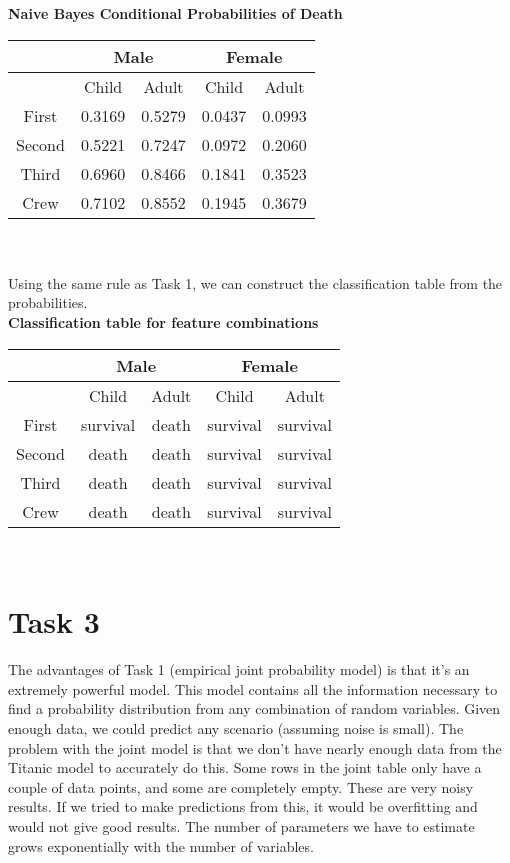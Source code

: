 \documentclass[letterpaper, 10pt]{article}
\begin{document}
\textbf{Naive Bayes Conditional Probabilities of Death} \\
\begin{tabular}{| c | c | c | c | c | }
    \hline
    & \multicolumn{2}{|c|}{Male} & \multicolumn{2}{|c|}{Female} \\ \hline
            & Child     & Adult     & Child     & Adult     \\ \hline
    First   & 0.3169  & 0.5279     & 0.0437  & 0.0993  \\ \hline
    Second  & 0.5221  & 0.7247     & 0.0972  & 0.2060  \\ \hline
    Third   & 0.6960     & 0.8466     & 0.1841     & 0.3523     \\ \hline
    Crew    & 0.7102  & 0.8552     & 0.1945  & 0.3679  \\ 
    \hline
\end{tabular}
\\\\

Using the same rule as Task 1, we can construct the classification table from the probabilities.
\\
\textbf{Classification table for feature combinations} \\
\begin{tabular}{| c | c | c | c | c | }
    \hline
    & \multicolumn{2}{|c|}{Male} & \multicolumn{2}{|c|}{Female} \\ \hline
            & Child     & Adult     & Child     & Adult     \\ \hline
    First   & survival  & death     & survival  & survival  \\ \hline
    Second  & death     & death     & survival  & survival  \\ \hline
    Third   & death     & death     & survival  & survival  \\ \hline
    Crew    & death     & death     & survival  & survival  \\ 
    \hline
\end{tabular}
\\

\section{Task 3}
The advantages of Task 1 (empirical joint probability model) is that it's an extremely powerful model. This model contains all the information necessary to find a probability distribution from any combination of random variables. Given enough data, we could predict any scenario (assuming noise is small). The problem with the joint model is that we don't have nearly enough data from the Titanic model to accurately do this. Some rows in the joint table only have a couple of data points, and some are completely empty. These are very noisy results. If we tried to make predictions from this, it would be overfitting and would not give good results. The number of parameters we have to estimate grows exponentially with the number of variables.
\end{document}
